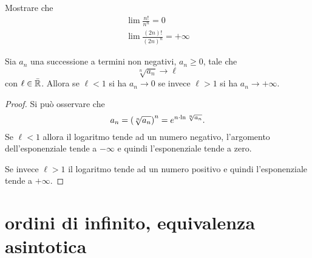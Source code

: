 \begin{exercise}
Mostrare che
\begin{gather*}
  \lim \frac{n!}{n^n} = 0 \\
  \lim \frac{(2n)!}{(2n)^n} = +\infty
\end{gather*}
\end{exercise}

\begin{theorem}
\label{th:criterio_radice}%
\mymark{***}%
%
%
Sia $a_n$ una successione a termini non negativi, $a_n\ge 0$, tale che
\[
  \sqrt[n]{a_n} \to \ell
\]
con $\ell \in \bar {{\mathbb R}}$.
Allora se $\ell<1$ si ha $a_n \to 0$ se invece $\ell > 1$ si ha $a_n \to +\infty$.
\end{theorem}
%
\begin{comment}
\begin{proof}
\mymark{**}
Consideriamo prima il caso $\ell < 1$.
Se $\lim \sqrt[n]{a_n} = \ell$ significa che per ogni $\eps>0$ la successione
$\sqrt[n]{a_n}$ risulta definitivamente minore di $\ell +\eps$.
Scegliendo opportunamente $\eps$ (ad esempio $\eps = (1-\ell)/2$) si potrà
avere $q = \ell+\eps < 1$. Dunque avremo definitivamente $\sqrt[n]{a_n}< q$
ovvero $a_n < q^n$. Per ipotesi $a_n\ge 0$
e quindi, tolto un numero finito di termini, si ottiene $0 \le a_n < q^n \to 0$
da cui $a_n \to 0$ (in quanto l'aver tolto un numero finito di termini non
cambia né il carattere né il limite della successione).

Se $\ell>1$ si potrà procedere in maniera analoga. Esisterà $q$ con $1 < q < \ell$ tale che definitivamente $\sqrt[n]{a_n} > q$ da cui $a_n > q^n \to +\infty$.
\end{proof}
\end{comment}

\begin{proof}
  Si può osservare che
  \[
    a_n = {\left( \sqrt[n]{a_n} \right)}^n
     = e^{n \cdot \ln \sqrt[n]{a_n}}.
  \]
  Se $\ell <1$ allora il logaritmo tende ad un numero negativo,
  l'argomento dell'esponenziale tende a $-\infty$ e quindi l'esponenziale tende a zero.

  Se invece $\ell>1$ il logaritmo tende ad un numero positivo e quindi l'esponenziale tende a $+\infty$.
\end{proof}

\section{ordini di infinito, equivalenza asintotica}

